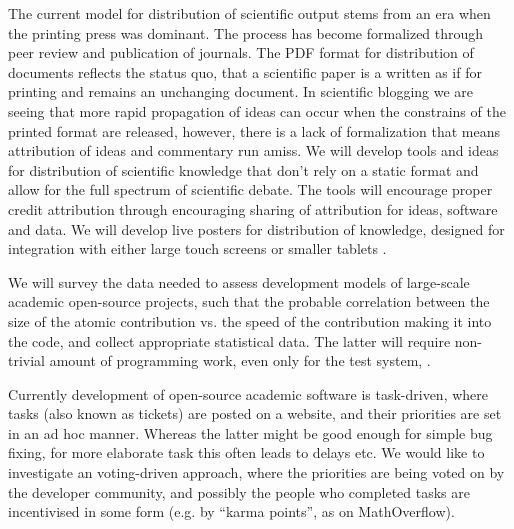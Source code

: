 \begin{workpackage}[id=social-aspects,wphases=1-48!.5,
  title=Social Aspects,
  lead=UO,
  UORM=1,USHRM=8, USORM=5]
\begin{tasklist}
\begin{task}[title=Modern Distribution of Scientific Output]
   The current model
  for distribution of scientific output stems from an era when the
  printing press was dominant. The process has become formalized
  through peer review and publication of journals. The PDF format for
  distribution of documents reflects the status quo, that a scientific
  paper is a written as if for printing and remains an unchanging
  document. In scientific blogging we are seeing that more rapid
  propagation of ideas can occur when the constrains of the printed
  format are released, however, there is a lack of formalization that
  means attribution of ideas and commentary run amiss. We will develop
  tools and ideas for distribution of scientific knowledge that don't
  rely on a static format and allow for the full spectrum of
  scientific debate. The tools will encourage proper credit
  attribution through encouraging sharing of attribution for ideas,
  software and data. We will develop live posters for distribution of knowledge, designed for integration with either large touch screens or smaller tablets .  
\end{task}

\begin{task}[title=Survey and collection of needed data,id=datacollection]
We will survey the data needed to assess development models of
large-scale academic open-source projects,
such that the probable correlation between the size of the atomic contribution
vs. the speed of the contribution making it into the code,
and collect appropriate statistical data. The latter will require non-trivial
amount of programming work, even only for the test system, \Sage.
\end{task}

\begin{task}[title=Collective decision making in development,id=decisionmaking]
Currently development of open-source academic software is task-driven, where tasks (also
known as tickets) are posted on a website, and their priorities are set in an ad hoc manner.
Whereas the latter might be good enough for simple bug fixing, for more elaborate task this
often leads to delays etc.
We would like to investigate an voting-driven approach, where the priorities are being
voted on by the developer community, and possibly the people who completed tasks
are incentivised in some form (e.g. by ``karma points'', as on MathOverflow).
\end{task}


\end{tasklist}
\end{workpackage}
